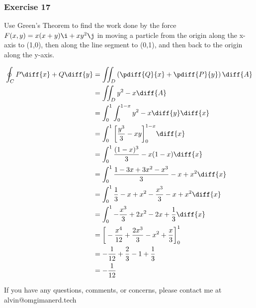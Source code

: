\documentclass{math}
\begin{document}
\subsubsection*{Exercise 17​}
Use Green's Theorem to find the work done by the force
\( F(x,y) = x(x+y)\i+xy^2\j \) in moving a particle from the origin along the
x-axis to (1,0), then along the line segment to (0,1), and then back to the
origin along the y-axis.
\begin{center}
\end{center}
\begin{align*}
  \oint_{C}P\diff{x}+Q\diff{y} &=
    \iint_{D}\left(\pdiff{Q}{x}+\pdiff{P}{y}\right)\diff{A} \\
  &= \iint_{D}y^2-x\diff{A} \\
  &= \int_{0}^{1}\int_{0}^{1-x}y^2-x\diff{y}\diff{x} \\
  &= \int_{0}^{1}\bigg[\frac{y^3}{3}-xy\bigg]_{0}^{1-x}\diff{x} \\
  &= \int_{0}^{1}\frac{(1-x)^3}{3}-x(1-x)\diff{x} \\
  &= \int_{0}^{1}\frac{1-3x+3x^2-x^3}{3}-x+x^2\diff{x} \\
  &= \int_{0}^{1}\frac{1}{3}-x+x^2-\frac{x^3}{3}-x+x^2\diff{x} \\
  &= \int_{0}^{1}-\frac{x^3}{3}+2x^2-2x+\frac{1}{3}\diff{x} \\
  &= \bigg[-\frac{x^4}{12}+\frac{2x^3}{3}-x^2+\frac{x}{3}\bigg]_{0}^{1} \\
  &= -\frac{1}{12}+\frac{2}{3}-1+\frac{1}{3} \\
  &= -\frac{1}{12}
\end{align*}

\begin{center}
  If you have any questions, comments, or concerns, please contact me at
  alvin@omgimanerd.tech
\end{center}
\end{document}
